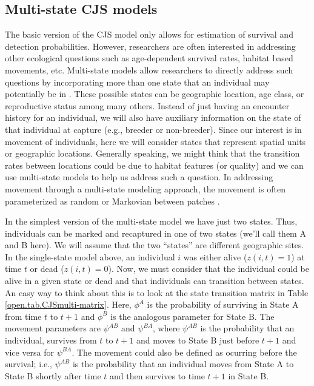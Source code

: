 \subsection{Multi-state CJS models}

The basic version of the CJS model only allows for estimation of
survival and detection probabilities.  However, researchers are often interested in
addressing other ecological questions such as age-dependent survival
rates, habitat based movements, etc.  Multi-state models allow
researchers to directly address such questions by incorporating more
than one state that an individual may potentially be in
\citep{arnason:1972,arnason:1973, brownie_etal:1993}.  These possible
states can be geographic location, age class, or reproductive status
among many others.  Instead of just having an encounter history for an
individual, we will also have auxiliary information on the state of
that individual at capture (e.g., breeder or non-breeder).  Since our
interest is in movement of individuals, here we will consider states
that represent spatial units or geographic locations.  Generally
speaking, we might think that the transition rates between locations
could be due to habitat features (or quality) and we can use
multi-state models to help us address such a question.  In addressing
movement through a multi-state modeling approach, the movement is
often parameterized as random or Markovian between patches
\citep{arnason:1972,arnason:1973, schwarz_etal:1993}.

In the simplest version of the multi-state model we have just two
states.  Thus, individuals can be marked and recaptured in one of two
states (we'll call them A and B here).  We will assume that the two
``states'' are different geographic sites.  In the single-state model
above, an individual $i$ was either alive ($z(i,t)=1$) at time $t$ or
dead ($z(i,t)=0$).  Now, we must consider that the individual could be
alive in a given state or dead and that individuals can transition
between states.  An easy way to think about this is to look at the
state transition matrix in Table \ref{open.tab.CJSmulti-matrix}.
Here, $\phi^A$ is the probability of surviving in State A from time
$t$ to $t+1$ and $\phi^B$ is the analogous parameter for State B.  The
movement parameters are $\psi^{AB}$ and $\psi^{BA}$, where $\psi^{AB}$
is the probability that an individual, survives from $t$ to $t+1$ and
moves to State B just before $t+1$ and vice versa for $\psi^{BA}$.
The movement could also be defined as ocurring before the survival;
i.e., $\psi^{AB}$ is the probability that an individual moves from
State A to State B shortly after time $t$ and then survives to time
$t+1$ in State B.

